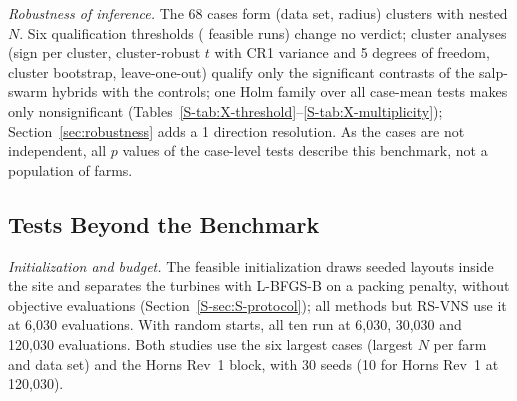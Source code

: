 \emph{Robustness of inference.} The 68 cases form \NXClusters{} (data set, radius) clusters with nested $N$. Six qualification thresholds (\NXThrList{} feasible runs) change no verdict; cluster analyses (sign per cluster, cluster-robust $t$ with CR1 variance and 5 degrees of freedom, cluster bootstrap, leave-one-out) qualify only the significant contrasts of the salp-swarm hybrids with the controls; one Holm family over all \NXMultN{} case-mean tests makes only \NXMultLostHolm{} nonsignificant (Tables~\ref{S-tab:X-threshold}--\ref{S-tab:X-multiplicity}); Section~\ref{sec:robustness} adds a 1\textdegree{} direction resolution. As the cases are not independent, all $p$ values of the case-level tests describe this benchmark, not a population of farms.

\subsection{Tests Beyond the Benchmark}
\label{sec:setup-beyond}
\emph{Initialization and budget.} The feasible initialization draws seeded layouts inside the site and separates the turbines with L-BFGS-B on a packing penalty, without objective evaluations (Section~\ref{S-sec:S-protocol}); all methods but RS-VNS use it at 6,030 evaluations. With random starts, all ten run at 6,030, 30,030 and 120,030 evaluations. Both studies use the six largest cases (largest $N$ per farm and data set) and the Horns Rev~1 block, with 30 seeds (10 for Horns Rev~1 at 120,030).

